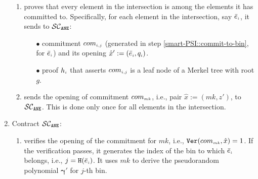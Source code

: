 \begin{enumerate}
\begin{enumerate}
\item \label{extractor-proves} proves that every element in the intersection is among the elements it has committed to. Specifically, for each element in the intersection, say $\bar{e}_{\scriptscriptstyle i}$, it sends to $\mathcal{SC}_{\mathtt{ANE}}$: 



\begin{enumerate}
%
%
\item [$\bullet$]  commitment $com_{\scriptscriptstyle i,j}$ (generated in step \ref{smart-PSI::commit-to-bin}, for $\bar{e}_{\scriptscriptstyle i}$) and its  opening ${\hat x}':=(\bar{e}_{\scriptscriptstyle i},  q_{\scriptscriptstyle i})$. 


%
%

%
\item[$\bullet$]   proof $h_{\scriptscriptstyle i}$ that asserts $com_{\scriptscriptstyle i,j}$ is a leaf node of   a Merkel tree with  root $g$. 

 \end{enumerate}
\item sends the opening of commitment $com_{\scriptscriptstyle mk}$, i.e., pair $\hat {x}:=(mk, z')$, to $\mathcal{SC}_{\mathtt{ANE}}$. This is done only once for all elements in the intersection.  

 \end{enumerate}
\item\label{e-psi::SC-verification} Contract $\mathcal{SC}_{\mathtt{ANE}}$:
%
\begin{enumerate}

\item\label{e-psi::SC-verification--derive-mk}  verifies the opening of the commitment for $mk$, i.e., $\mathtt{Ver}(com_{\scriptscriptstyle mk},\hat{x})=1$. If the verification passes, it generates the index of the bin to which $ \bar{e}_{\scriptscriptstyle i}$ belongs, i.e., ${ {  {j}}}=\mathtt{H}(\bar {e}_{\scriptscriptstyle i})$. It  uses $mk$ to derive the pseudorandom polynomial $\bm\gamma'$ for $j$-th bin. 



\end{enumerate}
\end{enumerate}

